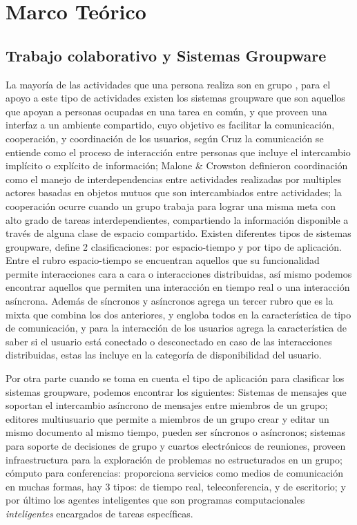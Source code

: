 \section{Marco Te\'orico}
\subsection{Trabajo colaborativo y Sistemas Groupware}

La mayor\'ia de las actividades que una persona realiza son en grupo \cite{ellis1991groupware}, para el apoyo a este tipo de actividades existen los sistemas groupware que son aquellos que apoyan a personas ocupadas en una tarea en com\'un, y que proveen una interfaz a un ambiente compartido, \cite{ellis1991groupware} cuyo objetivo es facilitar la comunicaci\'on, cooperaci\'on, y coordinaci\'on de los usuarios, seg\'un Cruz \cite{cruz2012towards} la comunicaci\'on se entiende como el proceso de interacci\'on entre personas que incluye el intercambio impl\'icito o expl\'icito de informaci\'on; Malone \& Crowston \cite{malone1994interdisciplinary} definieron coordinaci\'on como el manejo de interdependencias entre actividades realizadas por multiples actores basadas en objetos mutuos que son intercambiados entre actividades; la cooperaci\'on ocurre cuando un grupo trabaja para lograr una misma meta \cite{malone1994interdisciplinary} con alto grado de tareas interdependientes, compartiendo la informaci\'on disponible a trav\'es de alguna clase de espacio compartido. Existen diferentes tipos de sistemas groupware, \cite{ellis1991groupware} define 2 clasificaciones: por espacio-tiempo y por tipo de aplicaci\'on. Entre el rubro espacio-tiempo se encuentran aquellos que su funcionalidad permite interacciones cara a cara o interacciones distribuidas, as\'i mismo podemos encontrar aquellos que permiten una interacci\'on en tiempo real o una interacci\'on as\'incrona. Adem\'as de s\'incronos y as\'incronos agrega un tercer rubro que es la mixta que combina los dos anteriores, y engloba todos en la caracter\'istica de tipo de comunicaci\'on, y para la interacci\'on de los usuarios agrega la caracter\'istica de saber si el usuario est\'a conectado o desconectado en caso de las interacciones distribuidas, estas las incluye en la categor\'ia de disponibilidad del usuario\cite{antunes2014reviewing}.

Por otra parte cuando se toma en cuenta el tipo de aplicaci\'on para clasificar los sistemas groupware, podemos encontrar los siguientes: Sistemas de mensajes que soportan el intercambio as\'incrono de mensajes entre miembros de un grupo; editores multiusuario que permite a miembros de un grupo crear y editar un mismo documento al mismo tiempo, pueden ser s\'incronos o as\'incronos; sistemas para soporte de decisiones de grupo y cuartos electr\'onicos de reuniones, proveen infraestructura para la exploraci\'on de problemas no estructurados en un grupo; c\'omputo para conferencias: proporciona servicios como medios de comunicaci\'on en muchas formas, hay 3 tipos: de tiempo real, teleconferencia, y de escritorio; y por \'ultimo los agentes inteligentes que son programas computacionales \textit{inteligentes} encargados de tareas espec\'ificas.

